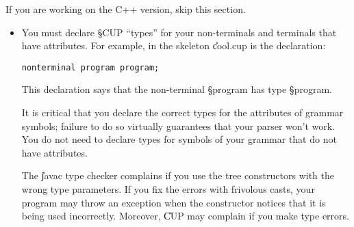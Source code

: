 \documentclass[11pt]{article}
\begin{document}
If you are working on the C++ version, skip this section.

\begin{itemize}

\item You must declare \S{CUP} ``types'' for your non-terminals and
terminals that have attributes.  For example, in the skeleton
\U{cool.cup} is the declaration:
\begin{verbatim}
nonterminal program program;
\end{verbatim}
This declaration says that the non-terminal \S{program} has type
\S{program}.

It is critical that you declare the correct types for the attributes of
grammar symbols; failure to do so virtually guarantees that your parser
won't work.  You do not need to declare types for symbols of your
grammar that do not have attributes.

The \U{javac} type checker complains if you use the tree constructors
with the wrong type parameters.  If you fix the errors with frivolous
casts, your program may throw an exception when the constructor notices
that it is being used incorrectly.  Moreover, \U{CUP} may complain if
you make type errors. 

\end{itemize}
\end{document}

